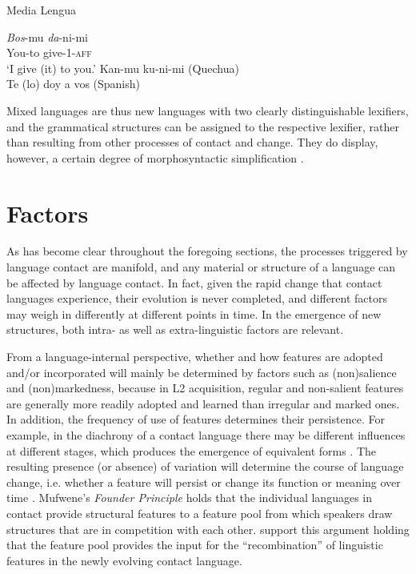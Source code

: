 \documentclass[output=paper]{langscibook}
\begin{document}
\ea Media Lengua \citep[384]{muysken1997media} \label{ex-ML}
    \begin{xlist}
       \ex \gll \textit{Bos}-mu	\textit{da}-ni-mi\\
                You-to	give-1-\textsc{aff}\\
\glt 	‘I give (it) to you.’
      \ex Kan-mu ku-ni-mi (Quechua)\\
      \ex Te (lo) doy a vos (Spanish)\\
        \end{xlist}
\z

Mixed languages are thus new languages with two clearly distinguishable lexifiers, and the grammatical structures can be assigned to the respective lexifier, rather than resulting from other processes of contact and change. They do display, however, a certain degree of morphosyntactic simplification \citep{mazzolifortcsecondary}.

\section{Factors} \label{sec:contact:factors}

As has become clear throughout the foregoing sections, the processes triggered by language contact are manifold, and any material or structure of a language can be affected by language contact. In fact, given the rapid change that contact languages experience, their evolution is never completed, and different factors may weigh in differently at different points in time. In the emergence of new structures, both intra- as well as extra-linguistic factors are relevant. 

From a language-internal perspective, whether and how features are adopted and/or incorporated will mainly be determined by factors such as (non)salience and (non)markedness, because in L2 acquisition, regular and non-salient features are generally more readily adopted and learned than irregular and marked ones. In addition, the frequency of use of features determines their persistence. For example, in the diachrony of a contact language there may be different influences at different stages, which produces the emergence of equivalent forms \citep{baptista2017competition}. The resulting presence (or absence) of variation will determine the course of language change, i.e. whether a feature will persist or change its function or meaning over time \citep[76]{mufweneetal2017}. Mufwene’s \parencite*{mufwene2001ecology} \emph{Founder Principle} holds that the individual languages in contact provide structural features to a feature pool from which speakers draw structures that are in competition with each other. \citet[50]{Aboh_2006} support this argument holding that the feature pool provides the input for the “recombination” of linguistic features in the newly evolving contact language.
\end{document}
